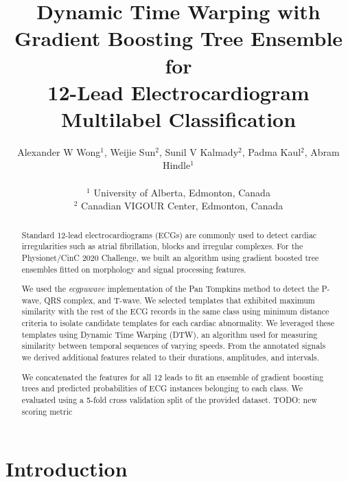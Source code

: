 \documentclass[twocolumn]{cinc}
\begin{document}


\title{Dynamic Time Warping with Gradient Boosting Tree Ensemble for \\
12-Lead Electrocardiogram Multilabel Classification}

\author {Alexander W Wong$^{1}$, Weijie Sun$^{2}$, Sunil V Kalmady$^{2}$, Padma Kaul$^{2}$, Abram Hindle$^{1}$\\
\ \\
 $^1$ University of Alberta, Edmonton, Canada \\
$^2$ Canadian VIGOUR Center, Edmonton, Canada }

\maketitle

\begin{abstract}

Standard 12-lead electrocardiograms (ECGs) are commonly used to detect cardiac irregularities such as atrial fibrillation, blocks and irregular complexes.
For the Physionet/CinC 2020 Challenge, we built an algorithm using gradient boosted tree ensembles fitted on morphology and signal processing features.

We used the \emph{ecgpuwave} implementation of the Pan Tompkins method to detect the P-wave, QRS complex, and T-wave.
We selected templates that exhibited maximum similarity with the rest of the ECG records in the same class using minimum distance criteria to isolate candidate templates for each cardiac abnormality.
We leveraged these templates using Dynamic Time Warping (DTW), an algorithm used for measuring similarity between temporal sequences of varying speeds.
From the annotated signals we derived additional features related to their durations, amplitudes, and intervals.

We concatenated the features for all 12 leads to fit an ensemble of gradient boosting trees and predicted probabilities of ECG instances belonging to each class.
We evaluated using a 5-fold cross validation split of the provided dataset.
TODO: new scoring metric

\end{abstract}

\section{Introduction}
\end{document}
